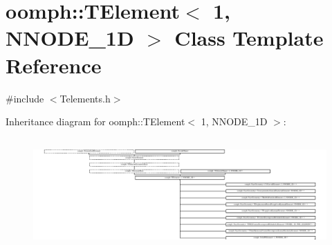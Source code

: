\hypertarget{classoomph_1_1TElement_3_011_00_01NNODE__1D_01_4}{}\section{oomph\+:\+:T\+Element$<$ 1, N\+N\+O\+D\+E\+\_\+1D $>$ Class Template Reference}
\label{classoomph_1_1TElement_3_011_00_01NNODE__1D_01_4}


{\ttfamily \#include $<$Telements.\+h$>$}

Inheritance diagram for oomph\+:\+:T\+Element$<$ 1, N\+N\+O\+D\+E\+\_\+1D $>$\+:\begin{figure}[H]
\begin{center}
\leavevmode
\includegraphics[height=4.298245cm]{classoomph_1_1TElement_3_011_00_01NNODE__1D_01_4}
\end{center}
\end{figure}
